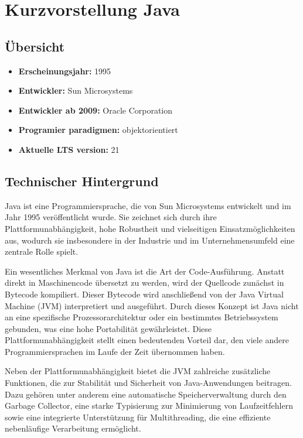 \documentclass[11pt]{article}
\begin{document}
    \section{Kurzvorstellung Java}

    \subsection{Übersicht}
    \begin{itemize}
        \item \textbf{Erscheinungsjahr:} 1995
        \item \textbf{Entwickler:} Sun Microsystems
        \item \textbf{Entwickler ab 2009:} Oracle Corporation
        \item \textbf{Programier paradigmen:} objektorientiert
        \item \textbf{Aktuelle LTS version:} 21
    \end{itemize}

    \subsection{Technischer Hintergrund}
    Java ist eine Programmiersprache, die von Sun Microsystems entwickelt und im Jahr 1995 veröffentlicht wurde.
    Sie zeichnet sich durch ihre Plattformunabhängigkeit, hohe Robustheit und vielseitigen Einsatzmöglichkeiten aus,
    wodurch sie insbesondere in der Industrie und im Unternehmensumfeld eine zentrale Rolle spielt.

    Ein wesentliches Merkmal von Java ist die Art der Code-Ausführung.
    Anstatt direkt in Maschinencode übersetzt zu werden, wird der Quellcode zunächst in Bytecode kompiliert.
    Dieser Bytecode wird anschließend von der Java Virtual Machine (JVM) interpretiert und ausgeführt.
    Durch dieses Konzept ist Java nicht an eine spezifische Prozessorarchitektur oder ein
    bestimmtes Betriebssystem gebunden, was eine hohe Portabilität gewährleistet.
    Diese Plattformunabhängigkeit stellt einen bedeutenden Vorteil dar, den
    viele andere Programmiersprachen im Laufe der Zeit übernommen haben.

    Neben der Plattformunabhängigkeit bietet die JVM zahlreiche zusätzliche
    Funktionen, die zur Stabilität und Sicherheit von Java-Anwendungen beitragen.
    Dazu gehören unter anderem eine automatische Speicherverwaltung
    durch den Garbage Collector, eine starke Typisierung zur Minimierung
    von Laufzeitfehlern sowie eine integrierte Unterstützung für Multithreading,
    die eine effiziente nebenläufige Verarbeitung ermöglicht. \cite[51 - 54]{insel}
\end{document}
